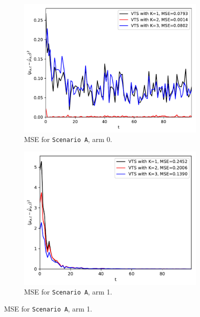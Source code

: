 \documentclass{article}
\begin{document}
\begin{figure}[!h]
	\centering
	\begin{subfigure}[b]{0.48\textwidth}
		\includegraphics[width=\textwidth]{./figs/model_a_mse_arm_0.pdf}
		\caption{MSE for \texttt{Scenario A}, arm 0.}
		\label{fig:model_a_mse_arm_0}
	\end{subfigure}
	\begin{subfigure}[b]{0.46\textwidth}
		\includegraphics[width=\textwidth]{./figs/model_a_mse_arm_1.pdf}
		\caption{MSE for \texttt{Scenario A}, arm 1.}
		\label{fig:model_a_mse_arm_1}
	\end{subfigure}
	

\end{figure}
\end{document}
